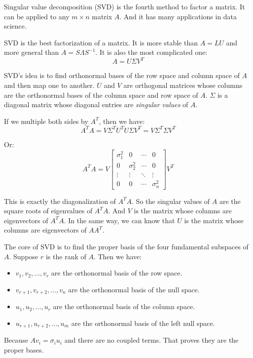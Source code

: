 \documentclass[10pt,a4paper,oneside,numbers=noenddot]{scrbook}
\theoremstyle{ctplain}
\theoremstyle{ctresult}
\begin{document}
Singular value decomposition (SVD) is the fourth method to factor a matrix. It can be
applied to any $m \times n$ matrix $A$. And it has many applications in data science.

SVD is the best factorization of a matrix. It is more stable than $A = LU$ and more general
than $A = S\Lambda S^{-1}$. It is also the most complicated one:
\[
  A = U\Sigma V^{T}
\]

SVD's idea is to find orthonormal bases of the row space and column space of $A$ and
then map one to another. $U$ and $V$ are orthogonal matrices whose columns are the
orthonormal bases of the column space and row space of $A$. $\Sigma$ is a diagonal
matrix whose diagonal entries are \emph{singular values} of $A$.

If we multiple both sides by $A^{T}$, then we have:
\[
  A^{T}A = V\Sigma^{T}U^{T}U\Sigma V^{T} = V\Sigma^{T}\Sigma V^{T}
\]

Or:
\[
  A^{T}A = V \begin{bmatrix}
    \sigma_1^2 & 0 & \cdots & 0 \\
    0 & \sigma_2^2 & \cdots & 0 \\
    \vdots & \vdots & \ddots & \vdots \\
    0 & 0 & \cdots & \sigma_n^2
  \end{bmatrix} V^{T}
\]

This is exactly the diagonalization of $A^{T}A$. So the singular values of $A$ are the
square roots of eigenvalues of $A^{T}A$. And $V$ is the matrix whose columns are
eigenvectors of $A^{T}A$. In the same way, we can know that $U$ is the matrix whose columns
are eigenvectors of $AA^{T}$.

The core of SVD is to find the proper basis of the four fundamental subspaces of $A$. Suppose
$r$ is the rank of $A$. Then we have:
\begin{itemize}
  \item $v_1, v_2, \ldots, v_r$ are the orthonormal basis of the row space.
  \item $v_{r+1}, v_{r+2}, \ldots, v_n$ are the orthonormal basis of the null space.
  \item $u_1, u_2, \ldots, u_r$ are the orthonormal basis of the column space.
  \item $u_{r+1}, u_{r+2}, \ldots, u_m$ are the orthonormal basis of the left null space.
\end{itemize}

Because $Av_i = \sigma_i u_i$ and there are no coupled terms. That proves they are the
proper bases.
\end{document}

